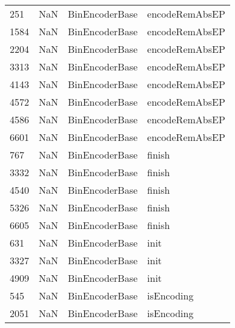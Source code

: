 \begin{tabular}{llll}
251  &                   NaN &             BinEncoderBase &                            encodeRemAbsEP \\
1584 &                   NaN &             BinEncoderBase &                            encodeRemAbsEP \\
2204 &                   NaN &             BinEncoderBase &                            encodeRemAbsEP \\
3313 &                   NaN &             BinEncoderBase &                            encodeRemAbsEP \\
4143 &                   NaN &             BinEncoderBase &                            encodeRemAbsEP \\
4572 &                   NaN &             BinEncoderBase &                            encodeRemAbsEP \\
4586 &                   NaN &             BinEncoderBase &                            encodeRemAbsEP \\
6601 &                   NaN &             BinEncoderBase &                            encodeRemAbsEP \\
767  &                   NaN &             BinEncoderBase &                                    finish \\
3332 &                   NaN &             BinEncoderBase &                                    finish \\
4540 &                   NaN &             BinEncoderBase &                                    finish \\
5326 &                   NaN &             BinEncoderBase &                                    finish \\
6605 &                   NaN &             BinEncoderBase &                                    finish \\
631  &                   NaN &             BinEncoderBase &                                      init \\
3327 &                   NaN &             BinEncoderBase &                                      init \\
4909 &                   NaN &             BinEncoderBase &                                      init \\
545  &                   NaN &             BinEncoderBase &                                isEncoding \\
2051 &                   NaN &             BinEncoderBase &                                isEncoding \\

\end{tabular}
